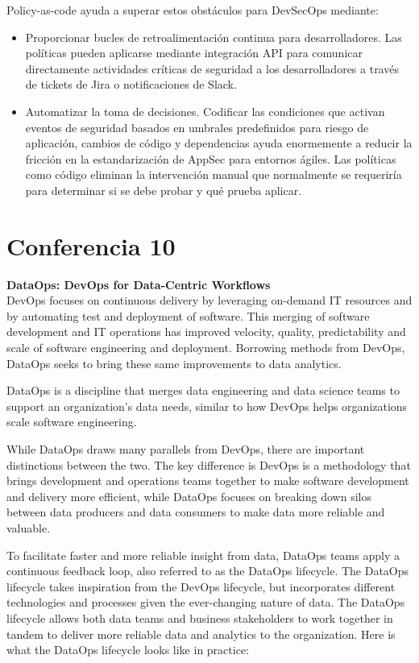 \documentclass[12pt]{book}
\begin{document}
Policy-as-code ayuda a superar estos obstáculos para DevSecOps mediante:
\begin{itemize}
    \item Proporcionar bucles de retroalimentación continua para desarrolladores. Las políticas pueden aplicarse mediante integración API para comunicar directamente actividades críticas de seguridad a los desarrolladores a través de tickets de Jira o notificaciones de Slack.
    \item Automatizar la toma de decisiones. Codificar las condiciones que activan eventos de seguridad basados en umbrales predefinidos para riesgo de aplicación, cambios de código y dependencias ayuda enormemente a reducir la fricción en la estandarización de AppSec para entornos ágiles. Las políticas como código eliminan la intervención manual que normalmente se requeriría para determinar si se debe probar y qué prueba aplicar.
\end{itemize}

\chapter{Conferencia 10}
\normalfont\LARGE \textbf{DataOps: DevOps for Data-Centric Workflows}
\normalfont\small\\
DevOps focuses on continuous delivery by leveraging on-demand IT resources and by automating test and deployment of software. This merging of software development and IT operations has improved velocity, quality, predictability and scale of software engineering and deployment. Borrowing methods from DevOps, DataOps seeks to bring these same improvements to data analytics.

DataOps is a discipline that merges data engineering and data science teams to support an organization's data needs, similar to how DevOps helps organizations scale software engineering.

While DataOps draws many parallels from DevOps, there are important distinctions between the two. 
The key difference is DevOps is a methodology that brings development and operations teams together to make software development and delivery more efficient, while DataOps focuses on breaking down silos between data producers and data consumers to make data more reliable and valuable. 

To facilitate faster and more reliable insight from data, DataOps teams apply a continuous feedback loop, also referred to as the DataOps lifecycle.
The DataOps lifecycle takes inspiration from the DevOps lifecycle, but incorporates different technologies and processes given the ever-changing nature of data.
The DataOps lifecycle allows both data teams and business stakeholders to work together in tandem to deliver more reliable data and analytics to the organization.
Here is what the DataOps lifecycle looks like in practice:
\end{document}
